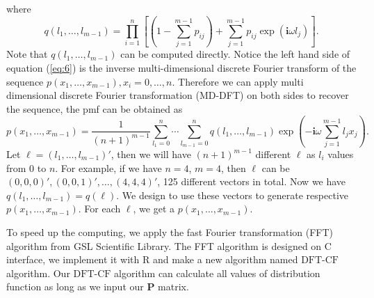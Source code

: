 \documentclass[12pt]{article}
\newcommand{\Pmat}{\mathbf{P}}
\newcommand{\ivec}{{\boldsymbol{i}}}
\newcommand{\dft}{{\textrm{DFT-CF}}}
\begin{document}
where
$$ 
q(l_1, \ldots, l_{m-1})=\prod_{i=1}^{n}\left[(1 - \sum_{j=1}^{m-1}p_{ij})+\sum_{j=1}^{m-1}p_{ij}\exp(\ivec \omega l_j)\right].
$$	
Note that $q(l_1, \ldots, l_{m-1})$ can be computed directly. Notice the left hand side of equation (\ref{eq:6}) is the inverse multi-dimensional discrete Fourier transform of the sequence $ p(x_1,\ldots,x_{m-1}), x_i = 0 , \dots, n$. Therefore we can apply multi dimensional discrete Fourier transformation (MD-DFT) on both sides to recover the sequence, the pmf can be obtained as
\begin{equation}\label{eq:7}
p(x_1, \ldots, x_{m-1}) = \frac{1}{(n+1)^{m-1}}\sum_{l_1 = 0}^{n}\cdots \sum_{l_{m-1} = 0}^n q(l_1, \ldots, l_{m-1}) \exp\left(-\ivec\omega\sum_{j=1}^{m-1}l_j x_j\right).
\end{equation}
Let $\ell = (l_1,\dots,l_{m-1})'$, then we will have $(n
+1)^{m-1}$ different $\ell$ as $l_i$ values from $0$ to $n$. For example, if we have $n=4$, $m=4$, then $\ell$ can be $(0, 0, 0)', (0, 0, 1)', \dots, (4, 4, 4)'$, 125 different vectors in total. Now we have $q(l_1,\dots,l_{m-1}) = q(\ell)$. We design to use these vectors to generate respective $p(x_1,\dots,x_{m-1})$. For each $\ell$, we get a $p(x_1,\dots,x_{m-1})$.

To speed up the computing, we apply the fast Fourier transformation (FFT) algorithm  from GSL Scientific Library. The FFT algorithm is designed on C interface, we implement it with R and make a new algorithm named $\dft$ algorithm. Our $\dft$ algorithm can calculate all values of distribution function as long as we input our $\Pmat$ matrix.



\end{document}
